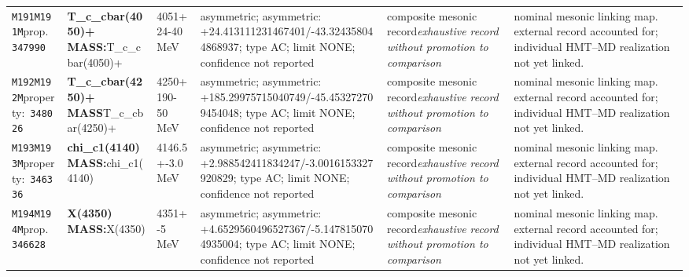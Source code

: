 \begin{landscape}
\begin{longtable}{L{1.85cm}L{4.45cm}L{2.35cm}L{4.05cm}L{3.35cm}L{7.15cm}}
\texttt{M191}\newline \texttt{M191M}\newline prop.\ \texttt{347990} & \textbf{T\_\allowbreak{}c\_\allowbreak{}cbar(4050)+ MASS:}\newline T\_\allowbreak{}c\_\allowbreak{}cbar(4050)+ & 4051+24-40\,MeV & asymmetric; asymmetric: +24.413111231467401/-43.324358044868937; type AC; limit NONE; confidence not reported & composite mesonic record\newline \emph{exhaustive record without promotion to comparison} & nominal mesonic linking map. external record accounted for; individual HMT--MD realization not yet linked. \\
\texttt{M192}\newline \texttt{M192M}\newline property:\ \texttt{348026} & \textbf{T\_\allowbreak{}c\_\allowbreak{}cbar(4250)+ MASS}\newline T\_\allowbreak{}c\_\allowbreak{}cbar(4250)+ & 4250+190-50\,MeV & asymmetric; asymmetric: +185.29975715040749/-45.453272709454048; type AC; limit NONE; confidence not reported & composite mesonic record\newline \emph{exhaustive record without promotion to comparison} & nominal mesonic linking map. external record accounted for; individual HMT--MD realization not yet linked. \\
\texttt{M193}\newline \texttt{M193M}\newline property:\ \texttt{346336} & \textbf{chi\_\allowbreak{}c1(4140) MASS:}\newline chi\_\allowbreak{}c1(4140) & 4146.5+-3.0\,MeV & asymmetric; asymmetric: +2.988542411834247/-3.0016153327920829; type AC; limit NONE; confidence not reported & composite mesonic record\newline \emph{exhaustive record without promotion to comparison} & nominal mesonic linking map. external record accounted for; individual HMT--MD realization not yet linked. \\
\texttt{M194}\newline \texttt{M194M}\newline prop.\ \texttt{346628} & \textbf{X(4350) MASS:}\newline X(4350) & 4351+-5\,MeV & asymmetric; asymmetric: +4.6529560496527367/-5.1478150704935004; type AC; limit NONE; confidence not reported & composite mesonic record\newline \emph{exhaustive record without promotion to comparison} & nominal mesonic linking map. external record accounted for; individual HMT--MD realization not yet linked. \\

\end{longtable}
\end{landscape}
